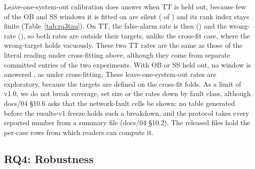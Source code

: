 Leave-one-system-out calibration does answer \NOFAULT when TT is held out, because few of the OB and SS windows it is fitted on are silent ( of ) and its rank index stays finite (Table~\ref{tab:rq3tau}).
On TT, the false-alarm rate is then  () and the wrong-\NOFAULT rate  (), so both rates are outside their targets, unlike the cross-fit case, where the wrong-\NOFAULT target holds vacuously.
These two TT rates are the same as those of the literal reading under cross-fitting above, although they come from separate committed entries of the two experiments.
With OB or SS held out, no window is answered \NOFAULT, as under cross-fitting.
These leave-one-system-out rates are exploratory, because the targets are defined on the cross-fit folds.
As a limit of v1.0, we do not break coverage, set size or the \NOFAULT rates down by fault class, although docs/04 §10.6 asks that the network-fault cells be shown: no table generated before the results-v1 freeze holds such a breakdown, and the protocol takes every reported number from a summary file (docs/04 §10.2).
The released  files hold the per-case rows from which readers can compute it.

\subsection{RQ4: Robustness}
\label{sec:rq4}


